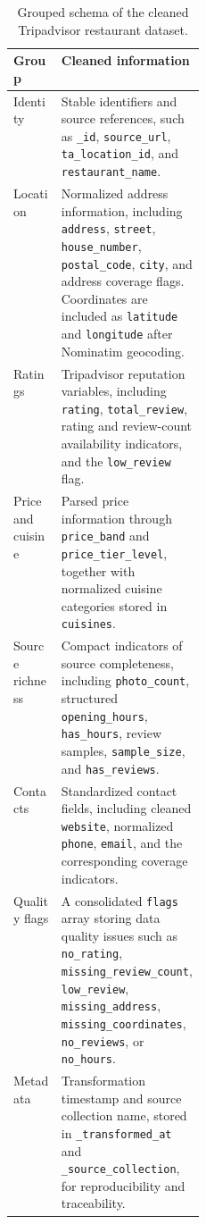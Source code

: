 \begin{table}[t]
\centering
\footnotesize
\setlength{\tabcolsep}{5pt}
\renewcommand{\arraystretch}{1.2}
\begin{tabularx}{\linewidth}{@{}p{0.25\linewidth}Y@{}}
\toprule
\textbf{Group} & \textbf{Cleaned information} \\
\midrule
Identity & Stable identifiers and source references, such as \texttt{\_id}, \texttt{source\_url}, \texttt{ta\_location\_id}, and \texttt{restaurant\_name}. \\
Location & Normalized address information, including \texttt{address}, \texttt{street}, \texttt{house\_number}, \texttt{postal\_code}, \texttt{city}, and address coverage flags. Coordinates are included as \texttt{latitude} and \texttt{longitude} after Nominatim geocoding. \\
Ratings & Tripadvisor reputation variables, including \texttt{rating}, \texttt{total\_review}, rating and review-count availability indicators, and the \texttt{low\_review} flag. \\
Price and cuisine & Parsed price information through \texttt{price\_band} and \texttt{price\_tier\_level}, together with normalized cuisine categories stored in \texttt{cuisines}. \\
Source richness & Compact indicators of source completeness, including \texttt{photo\_count}, structured \texttt{opening\_hours}, \texttt{has\_hours}, review samples, \texttt{sample\_size}, and \texttt{has\_reviews}. \\
Contacts & Standardized contact fields, including cleaned \texttt{website}, normalized \texttt{phone}, \texttt{email}, and the corresponding coverage indicators. \\
Quality flags & A consolidated \texttt{flags} array storing data quality issues such as \texttt{no\_rating}, \texttt{missing\_review\_count}, \texttt{low\_review}, \texttt{missing\_address}, \texttt{missing\_coordinates}, \texttt{no\_reviews}, or \texttt{no\_hours}. \\
Metadata & Transformation timestamp and source collection name, stored in \texttt{\_transformed\_at} and \texttt{\_source\_collection}, for reproducibility and traceability. \\
\bottomrule
\end{tabularx}
\caption{Grouped schema of the cleaned Tripadvisor restaurant dataset.}
\label{tab:clean-tripadvisor-schema}
\end{table}


